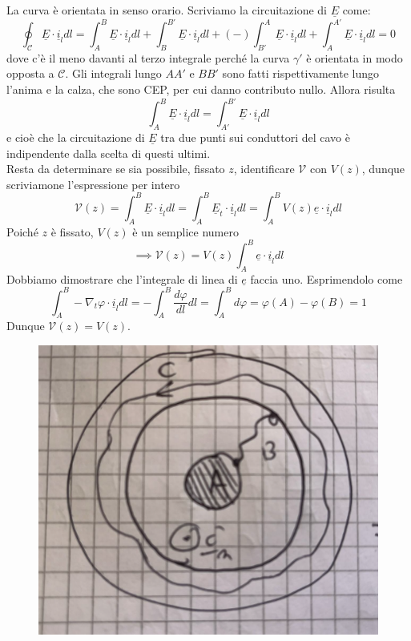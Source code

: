 \documentclass{book}
\begin{document}
        La curva è orientata in senso orario. Scriviamo la circuitazione di $\underline{E}$ come:
        \begin{equation}
        \oint_{\mathcal{C}} \underline{E} \cdot \underline{i}_{l}dl = \int_{A} ^{B}  \underline{E} \cdot \underline{i}_{l}dl + 
        \int_{B} ^{B'}  \underline{E} \cdot \underline{i}_{l}dl + (-) \int_{B'} ^{A}  \underline{E} \cdot \underline{i}_{l}dl + \int_{A} ^{A'}  \underline{E} \cdot \underline{i}_{l}dl = 0
        \end{equation}
        dove c'è il meno davanti al terzo integrale perché la curva $\gamma'$ è orientata in modo opposta a $\mathcal{C}$.
        Gli integrali lungo $AA'$ e $BB'$ sono fatti rispettivamente lungo l'anima e la calza, che sono CEP, per cui danno contributo nullo. Allora risulta
        \begin{equation}
        \int_{A} ^{B} \underline{E} \cdot \underline{i}_{l} dl = \int_{A'} ^{B'}  \underline{E} \cdot \underline{i}_{l}dl
        \end{equation}
        e cioè che la circuitazione di $\underline{E}$ tra due punti sui conduttori del cavo è indipendente dalla scelta di questi ultimi. \\
        Resta da determinare se sia possibile, fissato $z$, identificare $\mathcal{V}$ con $V(z)$, dunque scriviamone l'espressione per intero
        \begin{equation}
        \mathcal{V}(z) = \int_{A} ^{B} \underline{E} \cdot \underline{i}_{l}dl = \int_{A} ^{B} \underline{E}_{t} \cdot \underline{i}_{l} dl = \int_{A} ^{B} V(z)\underline{e} \cdot \underline{i}_{l} dl 
        \end{equation}
        Poiché $z$ è fissato, $V(z)$ è un semplice numero
        \begin{equation}
        \implies \mathcal{V}(z) = V(z) \int_{A} ^{B} \underline{e} \cdot \underline{i}_{l} dl
        \end{equation}
        Dobbiamo dimostrare che l'integrale di linea di $\underline{e}$ faccia uno. Esprimendolo come
        \begin{equation}
        \int_{A} ^{B} - \nabla_{t} \varphi \cdot \underline{i}_{l} dl = - \int_{A} ^{B} \frac{d \varphi}{d l} dl = \int_{A} ^{B} d \varphi = \varphi(A)-\varphi(B) = 1
        \end{equation}
        Dunque $\mathcal{V}(z) = V(z)$. \newpage 
        \begin{figure}[h!]
        \center  
        \includegraphics[width=0.6\linewidth]{img/Chapter_three/Chapter3img12.png}
        \end{figure}
\end{document}
